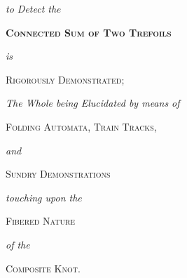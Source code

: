 \begin{titlepage}
    \vspace{0.3cm}

    {\Large \itshape to Detect the}

    \vspace{0.45cm}

    {\Huge \bfseries \scshape Connected Sum of Two Trefoils}

    \vspace{0.45cm}

    {\Large \itshape is}

    \vspace{0.3cm}

    {\LARGE \scshape Rigorously Demonstrated;}

    \vspace{0.7cm}

    {\Large \itshape The Whole being Elucidated by means of}

    \vspace{0.4cm}

    {\LARGE \scshape Folding Automata, Train Tracks,}

    \vspace{0.4cm}

    {\Large \itshape and}

    \vspace{0.4cm}

    {\LARGE \scshape Sundry Demonstrations}

    \vspace{0.3cm}

    {\Large \itshape touching upon the}

    \vspace{0.3cm}

    {\LARGE \scshape Fibered Nature}

    \vspace{0.3cm}

    {\Large \itshape of the}

    \vspace{0.3cm}

    {\LARGE \scshape Composite Knot.}

    \vspace*{\fill}

\end{titlepage}

\restoregeometry